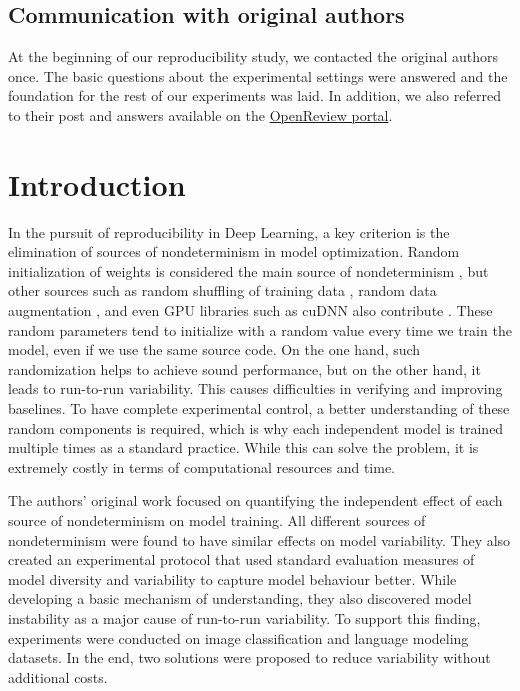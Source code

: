\subsection*{Communication with original authors}

At the beginning of our reproducibility study, we contacted the original authors once. The basic questions about the experimental settings were answered and the foundation for the rest of our experiments was laid. In addition, we also referred to their post and answers available on the \href{https://openreview.net/forum?id=SQ7EHTDyn9Y}{OpenReview portal}.

\newpage

\section{Introduction}
\label{sec:Introduction}
In the pursuit of reproducibility in Deep Learning, a key criterion is the elimination of sources of nondeterminism in model optimization. Random initialization of weights is considered the main source of nondeterminism \cite{zhuang2021randomness}, but other sources such as random shuffling of training data \cite{hartley2020dtoolai}, random data augmentation \cite{renard2020variability}, and even GPU libraries such as cuDNN also contribute \cite{heumos2021mlf} . These random parameters tend to initialize with a random value every time we train the model, even if we use the same source code. On the one hand, such randomization helps to achieve sound performance, but on the other hand, it leads to run-to-run variability. This causes difficulties in verifying and improving baselines. To have complete experimental control, a better understanding of these random components is required, which is why each independent model is trained multiple times as a standard practice. While this can solve the problem, it is extremely costly in terms of computational resources and time.

The authors' original work focused on quantifying the independent effect of each source of nondeterminism on model training. All different sources of nondeterminism were found to have similar effects on model variability. They also created an experimental protocol that used standard evaluation measures of model diversity and variability to capture model behaviour better. While developing a basic mechanism of understanding, they also discovered model instability as a major cause of run-to-run variability. To support this finding, experiments were conducted on image classification and language modeling datasets. In the end, two solutions were proposed to reduce variability without additional costs.

